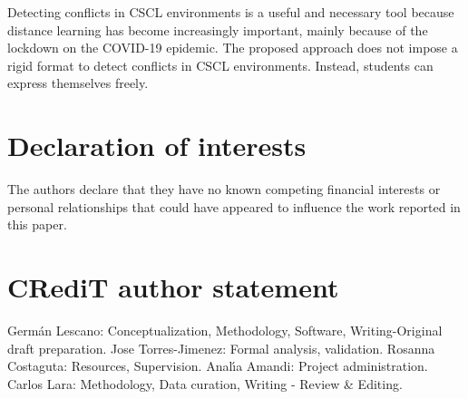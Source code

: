 \documentclass[3p,times,preprint]{elsarticle}
\begin{document}
Detecting conflicts in CSCL environments is a useful and necessary tool because distance learning has become increasingly important, mainly because of the lockdown on the COVID-19 epidemic. The proposed approach does not impose a rigid format to detect conflicts in CSCL environments. Instead, students can express themselves freely. 


\section*{Declaration of interests}
The authors declare that they have no known competing financial interests or personal relationships that could have appeared to influence the work reported in this paper.
 
 
\section*{CRediT author statement}
Germ\'an Lescano: Conceptualization, Methodology, Software,  Writing-Original draft preparation. Jose Torres-Jimenez:  Formal analysis, validation.  Rosanna Costaguta: Resources, Supervision. Anal\'{\i}a Amandi: Project administration. Carlos Lara: Methodology, Data curation, Writing - Review \& Editing.

\end{document}
